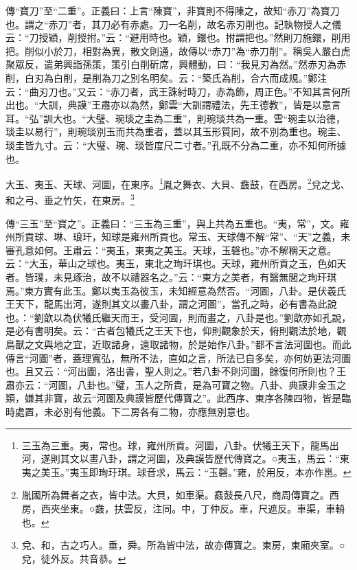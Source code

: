 {\noindent\zhuan{}\fzbyks 傳“寶刀”至“二重”。正義曰：上言“陳寶”，非寶則不得陳之，故知“赤刀”為寶刀也。謂之“赤刀”者，其刀必有赤處。刀一名削，故名赤刃削也。記執物授人之儀云：“刀授穎，削授拊。”云：“避用時也。穎，鐶也。拊謂把也。”然則刀施鐶，削用把。削似小於刀，相對為異，散文則通，故傳以“赤刀”為“赤刀削”。稱吳人嚴白虎聚眾反，遣弟興詣孫策，策引白削斫席，興體動，曰：“我見刃為然。”然赤刃為赤削，白刃為白削，是削為刀之別名明矣。云：“築氏為削，合六而成規。”鄭注云：“曲刃刀也。”又云：“赤刀者，武王誅紂時刀，赤為飾，周正色。”不知其言何所出也。“大訓，典謨”王肅亦以為然，鄭雲“大訓謂禮法，先王德教”，皆是以意言耳。“弘”訓大也。“大璧、琬琰之圭為二重”，則琬琰共為一重。雲“琬圭以治德，琰圭以易行”，則琬琰別玉而共為重者，蓋以其玉形質同，故不別為重也。琬圭、琰圭皆九寸。云：“大璧、琬、琰皆度尺二寸者。”孔既不分為二重，亦不知何所據也。 \par}

大玉、夷玉、天球、河圖，在東序。\footnote{三玉為三重。夷，常也。球，雍州所貢。河圖，八卦。伏犧王天下，龍馬出河，遂則其文以畫八卦，謂之河圖，及典謨皆歷代傳寶之。○夷玉，馬云：“東夷之美玉。”夷玉即珣玗琪。球音求，馬云：“玉磬。”雍，於用反，本亦作邕。}胤之舞衣、大貝、鼖鼓，在西房。\footnote{胤國所為舞者之衣，皆中法。大貝，如車渠。鼖鼓長八尺，商周傳寶之。西房，西夾坐東。○鼖，扶雲反，注同。中，丁仲反。車，尺遮反。車渠，車輈也。}兌之戈、和之弓、垂之竹矢，在東房。\footnote{兌、和，古之巧人。垂，舜。所為皆中法，故亦傳寶之。東房，東廂夾室。○兌，徒外反。共音恭。}


{\noindent\zhuan{}\fzbyks 傳“三玉”至“寶之”。正義曰：“三玉為三重”，與上共為五重也。“夷，常”，文。雍州所貢球、琳、琅玕，知球是雍州所貢也。常玉、天球傳不解“常”、“天”之義，未審孔意如何。王肅云：“夷玉，東夷之美玉。天球，玉磬也。”亦不解稱天之意。云：“大玉，華山之球也。夷玉，東北之珣玕琪也。天球，雍州所貢之玉，色如天者。皆璞，未見琢治，故不以禮器名之。”云：“東方之美者，有醫無閭之珣玕琪焉。”東方實有此玉。鄭以夷玉為彼玉，未知經意為然否。“河圖，八卦。是伏羲氏王天下，龍馬出河，遂則其文以畫八卦，謂之河圖”，當孔之時，必有書為此說也。：“劉歆以為伏犧氏繼天而王，受河圖，則而畫之，八卦是也。”劉歆亦如孔說，是必有書明矣。云：“古者包犧氏之王天下也，仰則觀象於天，俯則觀法於地，觀鳥獸之文與地之宜，近取諸身，遠取諸物，於是始作八卦。”都不言法河圖也。而此傳言“河圖”者，蓋理寬弘，無所不法，直如之言，所法已自多矣，亦何妨更法河圖也。且又云：“河出圖，洛出書，聖人則之。”若八卦不則河圖，餘復何所則也？王肅亦云：“河圖，八卦也。”璧，玉人之所貴，是為可寶之物。八卦、典謨非金玉之類，嫌其非寶，故云“河圖及典謨皆歷代傳寶之”。此西序、東序各陳四物，皆是臨時處置，未必別有他義。下二房各有二物，亦應無別意也。 \par}

